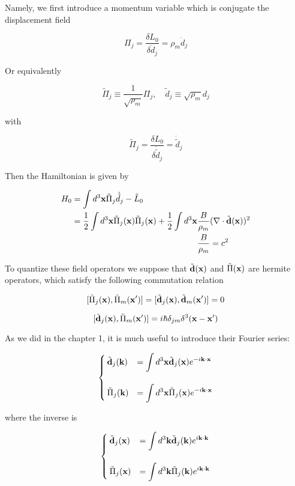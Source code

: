 Namely, we first introduce a momentum variable which is conjugate the displacement field

\[\Pi_j = \frac{\delta L_0}{\delta \dot{d}_j} = \rho_m\dot{d}_j \]

Or equivalently 

\[\tilde{\Pi}_j\equiv\frac{1}{\sqrt{\rho_m}}\Pi_j,\quad \tilde{d}_j\equiv\sqrt{\rho_m}d_j \]

with 

\[\tilde{\Pi}_j = \frac{\delta L_0}{\delta\dot{\tilde{d}}_j} = \dot{\tilde{d}}_j \]

Then the Hamiltonian is given by 

\[\begin{split}
H_0 &= \int d^3{\bf x}\tilde{\Pi}_j\dot{\tilde{d}}_j - \tilde{L}_0\\
 &=\frac{1}{2}\int d^3{\bf x}\tilde{\Pi}_j({\bf x})\tilde{\Pi}_j({\bf x}) + \frac{1}{2}\int d^3{\bf x}\frac{B}{\rho_m}(\nabla\cdot\tilde{\bf d}{\bf(x)})^2\\
 & \quad\quad\quad\quad\quad\quad\quad\quad\quad\quad\quad\quad\quad\quad\quad \frac{B}{\rho_m} = c^2
\end{split}\]

To quantize these field operators we suppose that $\tilde{\bf d}(\bf x)$ and $\tilde{\Pi}(\bf x)$ are hermite operators, which satisfy the following commutation relation

\[[\tilde{\Pi}_j({\bf x}),\tilde{\Pi}_m({\bf x'})] = [\tilde{\bf d}_j({\bf x}),\tilde{\bf d}_m({\bf x'})] = 0 \]

\[[\tilde{\bf d}_j({\bf x}), \tilde{\Pi}_m({\bf x'})] = i\hbar\delta_{jm}\delta^3(\bf x-x') \]

As we did in the chapter 1, it is much useful to introduce their Fourier series:

\[\begin{cases}
\tilde{\bf d}_j({\bf k}) &= \displaystyle\int d^3{\bf x}\tilde{\bf d}_j({\bf x}) e^{-i\bf k\cdot x}\\
\ & \\
\tilde{\Pi}_j({\bf k}) &= \displaystyle\int d^3 {\bf x} \tilde{\Pi}_j({\bf x}) e^{-i\bf k\cdot x}
\end{cases}\]

where the inverse is

\[\begin{cases}
\tilde{\bf d}_j({\bf x}) &= \displaystyle\int d^3{\bf k}\tilde{\bf d}_j({\bf k}) e^{i\bf k\cdot k}\\
\ & \\
\tilde{\Pi}_j({\bf x}) &= \displaystyle\int d^3 {\bf k} \tilde{\Pi}_j({\bf k}) e^{i\bf k\cdot k}
\end{cases}\]

